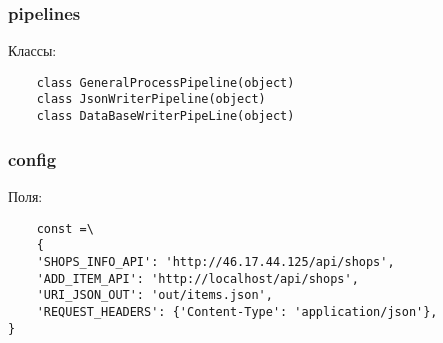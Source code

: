 \subsubsection{pipelines}

Классы:\\
\begin{small}
    \begin{verbatim}
    class GeneralProcessPipeline(object)
    class JsonWriterPipeline(object)
    class DataBaseWriterPipeLine(object)
    \end{verbatim}
\end{small}

\subsubsection{config}

Поля:\\

\begin{small}
    \begin{verbatim}
    const =\
    {
    'SHOPS_INFO_API': 'http://46.17.44.125/api/shops',
    'ADD_ITEM_API': 'http://localhost/api/shops',
    'URI_JSON_OUT': 'out/items.json',
    'REQUEST_HEADERS': {'Content-Type': 'application/json'},
}
    \end{verbatim}
\end{small}
